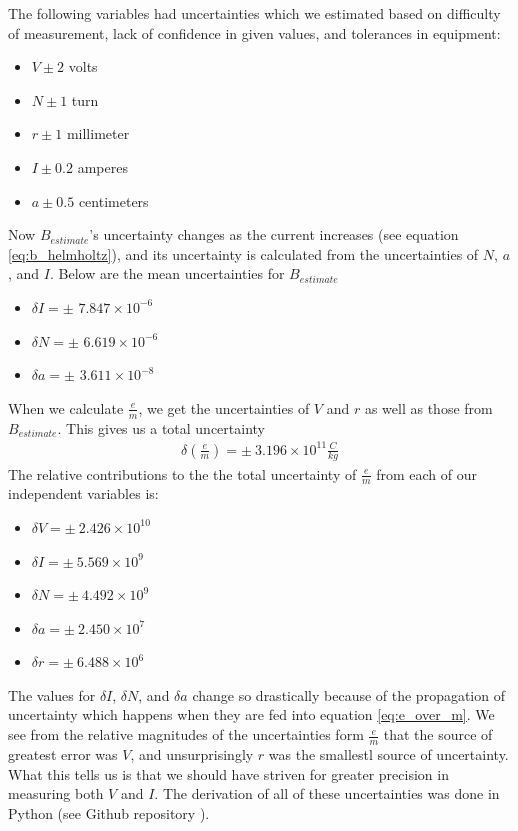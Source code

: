 \documentclass[aps,twocolumn,secnumarabic,amsmath,amssymb,nofootinbib]{revtex4-1}
\begin{document}
The following variables had uncertainties which we estimated based on difficulty of measurement, lack of confidence in given values, and tolerances in equipment:
\begin{itemize}[label={}, noitemsep]
	\item $V \pm 2$ volts
	\item $N \pm 1$ turn
	\item $r \pm 1$ millimeter
	\item $I \pm 0.2$ amperes
	\item $a \pm 0.5$ centimeters
\end{itemize}
Now $B_{estimate}$'s uncertainty changes as the current increases (see equation \ref{eq:b_helmholtz}), and its uncertainty is calculated from the uncertainties of $N$, $a$, and $I$. Below are the mean uncertainties for $B_{estimate}$
\begin{itemize}[label={}, noitemsep]
	\item $\delta I = \pm$ $7.847\times 10^{-6}$
	\item $\delta N = \pm$ $6.619 \times 10^{-6}$
	\item $\delta a = \pm$ $3.611 \times 10^{-8}$
\end{itemize}
When we calculate $\frac{e}{m}$, we get the uncertainties of $V$ and $r$ as well as those from $B_{estimate}$. This gives us a total uncertainty
\begin{align*}
	\delta(\frac{e}{m}) = \pm \ 3.196\times 10^{11} \frac{C}{kg}
\end{align*}
The relative contributions to the the total uncertainty of $\frac{e}{m}$ from each of our independent variables is:
\begin{itemize}[label={}, noitemsep]
	\item $\delta V = \pm \  2.426 \times 10^{10}$
	\item $\delta I = \pm \  5.569 \times 10^9$
	\item $\delta N = \pm \ 4.492 \times 10^9$
	\item $\delta a = \pm \ 2.450 \times 10^7$
	\item $\delta r = \pm \  6.488 \times 10^6$
\end{itemize}
The values for $\delta I$, $\delta N$, and $\delta a$ change so drastically because of the propagation of uncertainty which happens when they are fed into equation \ref{eq:e_over_m}. We see from the relative magnitudes of the uncertainties form $\frac{e}{m}$ that the source of greatest error was $V$, and unsurprisingly $r$ was the smallestl source of uncertainty. What this tells us is that we should have striven for greater precision in measuring both $V$ and $I$. The derivation of all of these uncertainties was done in Python (see Github repository \cite{github}).
\end{document}
